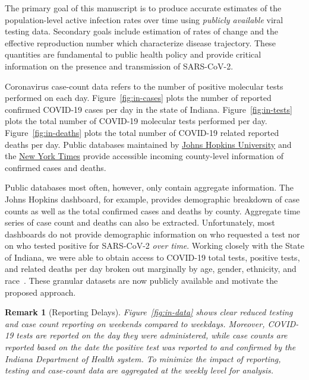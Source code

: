 \documentclass[11pt]{amsart}
\numberwithin{equation}{section}
\theoremstyle{plain}
\newtheorem{remark}{Remark}
\begin{document}
 The primary goal of this manuscript is to produce accurate estimates of the population-level active infection rates over time using \emph{publicly available} viral testing data.  Secondary goals include estimation of rates of change and the effective reproduction number which characterize disease trajectory.
 These quantities are fundamental to public health policy and provide critical information on the presence and transmission of SARS-CoV-2.



 Coronavirus case-count data refers to the number of positive molecular tests performed on each day.  Figure~\ref{fig:in-cases} plots the number of reported confirmed COVID-19 cases per day in the state of Indiana.  Figure~\ref{fig:in-tests} plots the total number of COVID-19 molecular tests performed per day. Figure~\ref{fig:in-deaths} plots the total number of COVID-19 related reported deaths per day. Public databases maintained by \href{https://bit.ly/2UqFSuA}{Johns Hopkins University} and the \href{https://bit.ly/2vUHfrK}{New York Times} provide accessible incoming county-level information of confirmed cases and deaths.

 Public databases most often, however, only contain aggregate information.  The Johns Hopkins dashboard, for example, provides demographic breakdown of case counts as well as the total confirmed cases and deaths by county.  Aggregate time series of case count and deaths can also be extracted.  Unfortunately, most dashboards do not provide demographic information on who requested a test nor on who tested positive for SARS-CoV-2 \emph{over time}. Working closely with the State of Indiana, we were able to obtain access to COVID-19 total tests, positive tests, and related deaths per day broken out marginally by age, gender, ethnicity, and race~\citep{IndianaData2021}.  These granular datasets are now publicly available and motivate the proposed approach.

\begin{remark}[Reporting Delays]
Figure~\ref{fig:in-data} shows clear reduced testing and case count reporting on weekends compared to weekdays. Moreover, COVID-19 tests are reported on the day they were administered, while case counts are reported based on the date the positive test was reported to and confirmed by the Indiana Department of Health system.  To minimize the impact of reporting, testing and case-count data are aggregated at the weekly level for analysis.
 \end{remark}
\end{document}
